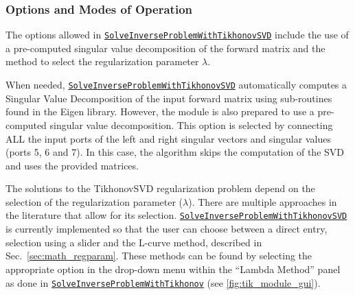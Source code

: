     \subsubsection{Options and Modes of Operation}
    
    The options allowed in \href{http://scirundocwiki.sci.utah.edu/SCIRunDocs/index.php5/CIBC:Documentation:SCIRun:Reference:BioPSE:SolveInverseProblemWithTikhonovSVD}{{\tt SolveInverseProblemWithTikhonovSVD}} include the use of a pre-computed singular value decomposition of the forward matrix and the method to select the regularization parameter $\lambda$.
    
    
    When needed, \href{http://scirundocwiki.sci.utah.edu/SCIRunDocs/index.php5/CIBC:Documentation:SCIRun:Reference:BioPSE:SolveInverseProblemWithTikhonovSVD}{{\tt SolveInverseProblemWithTikhonovSVD}} automatically computes a Singular Value Decomposition of the input forward matrix using sub-routines found in the Eigen library.
    However, the module is also prepared to use a pre-computed singular value decomposition. 
    This option is selected by connecting ALL the input ports of the left and right singular vectors and singular values (ports 5, 6 and 7).
    In this case, the algorithm skips the computation of the SVD and uses the provided matrices.
    
    
    The solutions to the TikhonovSVD regularization problem depend on the selection of the regularization parameter ($\lambda$).
    There are multiple approaches in the literature that allow for its selection.
    \href{http://scirundocwiki.sci.utah.edu/SCIRunDocs/index.php5/CIBC:Documentation:SCIRun:Reference:BioPSE:SolveInverseProblemWithTikhonovSVD}{{\tt SolveInverseProblemWithTikhonovSVD}} is currently implemented so that the user can choose between a direct entry, selection using a slider and the L-curve method, described in Sec.~\ref{sec:math_regparam}.
    These methods can be found by selecting the appropriate option in the drop-down menu within the ``Lambda Method'' panel as done in \href{http://scirundocwiki.sci.utah.edu/SCIRunDocs/index.php/CIBC:Documentation:SCIRun:Reference:BioPSE:SolveInverseProblemWithTikhonov}{{\tt SolveInverseProblemWithTikhonov}} (see \autoref{fig:tik_module_gui}).
    
